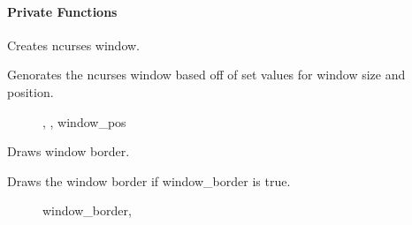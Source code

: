 \documentclass[letterpaper,10pt,english]{sphinxmanual}
\begin{document}
\begin{fulllineitems}
\begin{fulllineitems}
\end{fulllineitems}

\paragraph{Private Functions}

\begin{fulllineitems}
\label{\detokenize{index:_CPPv2N7ostendo6Window9GenWindowEv}}%
\pysigstartmultiline
{}\label{\detokenize{index:Pessumclassostendo_1_1Window_1a47e3c346e97daf8065969a293908c3c9}}%
\pysigstopmultiline
Creates ncurses window. 

Genorates the ncurses window based off of set values for window size and position. \begin{description}
\item[{}] \leavevmode
{\hyperref[\detokenize{index:Pessumclassostendo_1_1Window_1a34de0bce2e7291c403dc0118309095fe}]{}}, {\hyperref[\detokenize{index:Pessumclassostendo_1_1Window_1a3e01eaa1fdbbb8be629165078169b60c}]{}}, window\_pos 

\end{description}


\end{fulllineitems}


\begin{fulllineitems}
\label{\detokenize{index:_CPPv2N7ostendo6Window10DrawBorderEv}}%
\pysigstartmultiline
{}\label{\detokenize{index:Pessumclassostendo_1_1Window_1aecb54104edc6ff82b9b0a992d308509b}}%
\pysigstopmultiline
Draws window border. 

Draws the window border if window\_border is true. \begin{description}
\item[{}] \leavevmode
window\_border, {\hyperref[\detokenize{index:Pessumclassostendo_1_1Window_1a0f4f6327f9f42fa76c08d18d97059d7c}]{}} 

\end{description}


\end{fulllineitems}


\end{fulllineitems}
\end{document}
